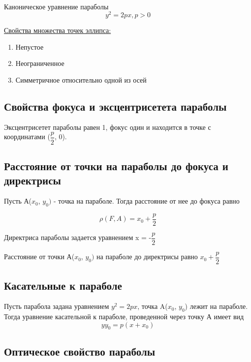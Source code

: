 \tab\\ 

Каноническое уравнение параболы
\[
y^2 = 2px, p > 0
\]

\underline{Свойства множества точек эллипса:}
\begin{enumerate}
    \item Непустое
    \item Неограниченное
    \item Симметричное относительно одной из осей
\end{enumerate}
\clearpage

\subsection{Свойства фокуса и эксцентрисетета параболы}

Эксцентрисетет параболы равен 1, фокус один и находится в точке с координатами ($\dfrac{p}{2}$, 0).

\subsection{Расстояние от точки на параболы до фокуса и директрисы}

Пусть А($x_0$, $y_0)$ - точка на параболе. Тогда расстояние от нее до фокуса равно

\[
\rho(F, A) = x_0 + \dfrac{p}{2}
\]

\begin{definition}
    Директриса параболы задается уравнением x = -$\dfrac{p}{2}$
\end{definition}

Расстояние от точки А($x_0$, $y_0)$ на параболе до директрисы равно $x_0 + \dfrac{p}{2}$

\subsection{Касательные к параболе}

Пусть парабола задана уравнением $y^2 = 2px$, точка A($x_0$, $y_0$) лежит на параболе. Тогда уравнение касательной к параболе, проведенной через точку А имеет вид
    \[
    yy_0 = p(x + x_0)
    \]
    
\subsection{Оптическое свойство параболы}

